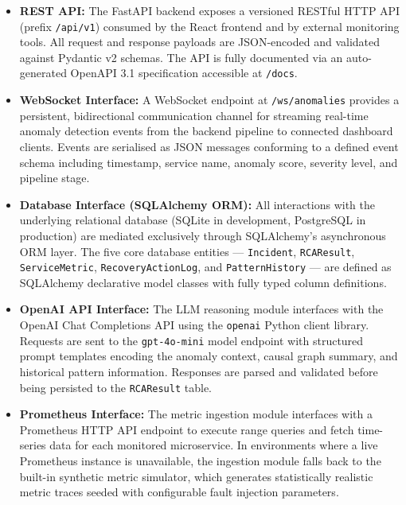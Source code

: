 \begin{itemize}

    \item \textbf{REST API:} The FastAPI backend exposes a versioned RESTful HTTP API (prefix \texttt{/api/v1}) consumed by the React frontend and by external monitoring tools. All request and response payloads are JSON-encoded and validated against Pydantic v2 schemas. The API is fully documented via an auto-generated OpenAPI 3.1 specification accessible at \texttt{/docs}.

    \item \textbf{WebSocket Interface:} A WebSocket endpoint at \texttt{/ws/anomalies} provides a persistent, bidirectional communication channel for streaming real-time anomaly detection events from the backend pipeline to connected dashboard clients. Events are serialised as JSON messages conforming to a defined event schema including timestamp, service name, anomaly score, severity level, and pipeline stage.

    \item \textbf{Database Interface (SQLAlchemy ORM):} All interactions with the underlying relational database (SQLite in development, PostgreSQL in production) are mediated exclusively through SQLAlchemy's asynchronous ORM layer. The five core database entities — \texttt{Incident}, \texttt{RCAResult}, \texttt{ServiceMetric}, \texttt{RecoveryActionLog}, and \texttt{PatternHistory} — are defined as SQLAlchemy declarative model classes with fully typed column definitions.

    \item \textbf{OpenAI API Interface:} The LLM reasoning module interfaces with the OpenAI Chat Completions API using the \texttt{openai} Python client library. Requests are sent to the \texttt{gpt-4o-mini} model endpoint with structured prompt templates encoding the anomaly context, causal graph summary, and historical pattern information. Responses are parsed and validated before being persisted to the \texttt{RCAResult} table.

    \item \textbf{Prometheus Interface:} The metric ingestion module interfaces with a Prometheus HTTP API endpoint to execute range queries and fetch time-series data for each monitored microservice. In environments where a live Prometheus instance is unavailable, the ingestion module falls back to the built-in synthetic metric simulator, which generates statistically realistic metric traces seeded with configurable fault injection parameters.

\end{itemize}
